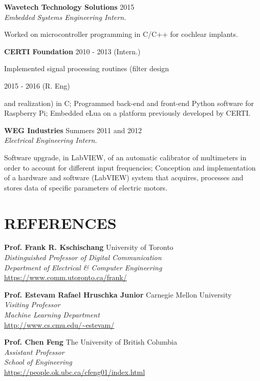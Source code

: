 \documentclass[margin, line]{res}
\begin{document}
\begin{resume}
\textbf{Wavetech Technology Solutions} \hfill 2015\\
{\sl Embedded Systems Engineering Intern.}\\
\begin{small}
    Worked on microcontroller programming in C/C++ for cochlear implants.
\end{small}

\textbf{CERTI Foundation} \hfill 2010 - 2013 (Intern.)\\
\begin{small}
    Implemented signal processing routines (filter design 
\end{small}
\hfill 2015 - 2016 (R. Eng)\\ 
\begin{small}
    and realization) in C; Programmed back-end and front-end Python software for Raspberry Pi; Embedded eLua on a platform previously developed by CERTI.
\end{small}
\newpage
\textbf{WEG Industries}  \hfill Summers 2011 and 2012\\
{\sl Electrical Engineering Intern.}\\
\begin{small}
    Software upgrade, in LabVIEW, of an automatic calibrator of multimeters in order to account for different input frequencies; Conception and implementation of a hardware and software (LabVIEW) system that acquires, processes and stores data of specific parameters of electric motors.
\end{small}

\section{REFERENCES}
\textbf{Prof. Frank R. Kschischang} \hfill University of Toronto\\
{\sl Distinguished Professor of Digital Communication}\\
{\sl Department of Electrical \& Computer Engineering}\\
\url{https://www.comm.utoronto.ca/frank/}

\textbf{Prof. Estevam Rafael Hruschka Junior} \hfill Carnegie Mellon University\\
{\sl Visiting Professor}\\
{\sl Machine Learning Department}\\
\url{http://www.cs.cmu.edu/~estevam/}

\textbf{Prof. Chen Feng} \hfill The University of British Columbia\\
{\sl Assistant Professor}\\
{\sl School of Engineering}\\
\url{https://people.ok.ubc.ca/cfeng01/index.html}


\end{resume}
\end{document}
